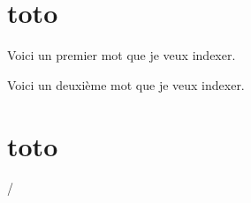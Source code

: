 \documentclass{book}
\begin{document}
\section{toto}
\begin{pages}

\begin{Leftside}  
  \beginnumbering
  \pstart
  Voici un premier mot que je veux indexer.
  \pend
  \endnumbering
\end{Leftside}

\begin{Rightside}
  \beginnumbering
  \pstart
  \label{la}Voici un deuxième mot que je veux indexer.
  \pend
  \endnumbering
\end{Rightside}

\end{pages}

\Pages
\section{toto}
\pageref{la}/

\tableofcontents

\end{document}
